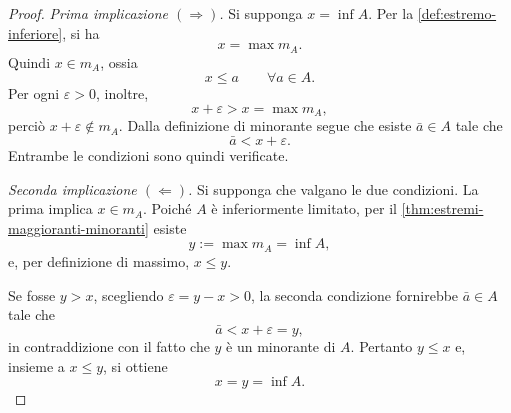 \begin{proof}
\emph{Prima implicazione \((\Rightarrow)\).}
Si supponga \(x=\inf A\). Per la
\cref{def:estremo-inferiore}, si ha
\[
  x=\max m_A.
\]
Quindi \(x\in m_A\), ossia
\[
  x\le a\qquad\forall a\in A.
\]
Per ogni \(\varepsilon>0\), inoltre,
\[
  x+\varepsilon>x=\max m_A,
\]
perciò \(x+\varepsilon\notin m_A\). Dalla definizione di minorante
segue che esiste \(\bar a\in A\) tale che
\[
  \bar a<x+\varepsilon.
\]
Entrambe le condizioni sono quindi verificate.

\emph{Seconda implicazione \((\Leftarrow)\).}
Si supponga che valgano le due condizioni. La prima implica
\(x\in m_A\). Poiché \(A\) è inferiormente limitato,
per il \cref{thm:estremi-maggioranti-minoranti} esiste
\[
  y:=\max m_A=\inf A,
\]
e, per definizione di massimo, \(x\le y\).

Se fosse \(y>x\), scegliendo \(\varepsilon=y-x>0\),
la seconda condizione fornirebbe \(\bar a\in A\) tale che
\[
  \bar a<x+\varepsilon=y,
\]
in contraddizione con il fatto che \(y\) è un minorante di
\(A\). Pertanto \(y\le x\) e, insieme a \(x\le y\), si ottiene
\[
  x=y=\inf A.
\]
\end{proof}
